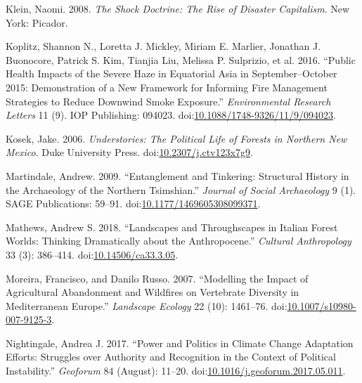 \documentclass[
]{article}
\newlength{\cslhangindent}
\newenvironment{CSLReferences}[2] %
 {\begin{list}{}{%
  \setlength{\itemindent}{0pt}
  \setlength{\leftmargin}{0pt}
  \setlength{\parsep}{0pt}
  \ifodd #1
   \setlength{\leftmargin}{\cslhangindent}
   \setlength{\itemindent}{-1\cslhangindent}
  \fi
  \setlength{\itemsep}{#2\baselineskip}}}
 {\end{list}}
\begin{document}
\begin{CSLReferences}{1}{0}
Klein, Naomi. 2008. \emph{The Shock Doctrine: The Rise of Disaster Capitalism}. New York: Picador.

Koplitz, Shannon N., Loretta J. Mickley, Miriam E. Marlier, Jonathan J. Buonocore, Patrick S. Kim, Tianjia Liu, Melissa P. Sulprizio, et al. 2016. {``Public Health Impacts of the Severe Haze in {Equatorial Asia} in {September}--{October} 2015: Demonstration of a New Framework for Informing Fire Management Strategies to Reduce Downwind Smoke Exposure.''} \emph{Environmental Research Letters} 11 (9). IOP Publishing: 094023. doi:\href{https://doi.org/10.1088/1748-9326/11/9/094023}{10.1088/1748-9326/11/9/094023}.

Kosek, Jake. 2006. \emph{Understories: {The Political Life} of {Forests} in {Northern New Mexico}}. Duke University Press. doi:\href{https://doi.org/10.2307/j.ctv123x7g9}{10.2307/j.ctv123x7g9}.

Martindale, Andrew. 2009. {``Entanglement and Tinkering: {Structural} History in the Archaeology of the {Northern Tsimshian}.''} \emph{Journal of Social Archaeology} 9 (1). SAGE Publications: 59--91. doi:\href{https://doi.org/10.1177/1469605308099371}{10.1177/1469605308099371}.

Mathews, Andrew S. 2018. {``Landscapes and {Throughscapes} in {Italian Forest Worlds}: {Thinking Dramatically} about the {Anthropocene}.''} \emph{Cultural Anthropology} 33 (3): 386--414. doi:\href{https://doi.org/10.14506/ca33.3.05}{10.14506/ca33.3.05}.

Moreira, Francisco, and Danilo Russo. 2007. {``Modelling the Impact of Agricultural Abandonment and Wildfires on Vertebrate Diversity in {Mediterranean Europe}.''} \emph{Landscape Ecology} 22 (10): 1461--76. doi:\href{https://doi.org/10.1007/s10980-007-9125-3}{10.1007/s10980-007-9125-3}.

Nightingale, Andrea J. 2017. {``Power and Politics in Climate Change Adaptation Efforts: {Struggles} over Authority and Recognition in the Context of Political Instability.''} \emph{Geoforum} 84 (August): 11--20. doi:\href{https://doi.org/10.1016/j.geoforum.2017.05.011}{10.1016/j.geoforum.2017.05.011}.


\end{CSLReferences}
\end{document}
